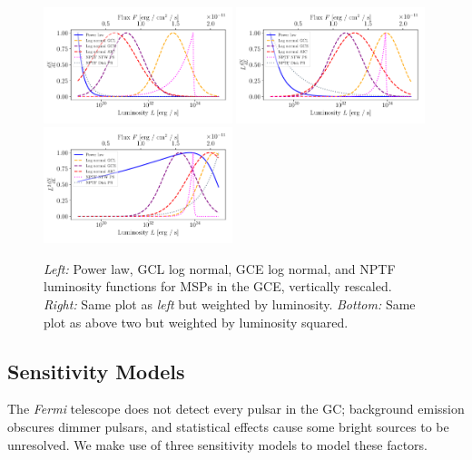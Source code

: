 \documentclass[a4paper,11pt]{article}
\begin{document}
\begin{figure}
    \centering
    \includegraphics[width=0.49\textwidth]{figs/lum-funcs.pdf}
    \includegraphics[width=0.49\textwidth]{figs/l-lum-funcs.pdf}
    \includegraphics[width=0.49\textwidth]{figs/l2-lum-funcs.pdf}
    \caption{\textit{Left:} Power law, GCL log normal, GCE log normal, and NPTF luminosity functions for MSPs in the GCE, vertically rescaled. \textit{Right:} Same plot as \textit{left} but weighted by luminosity. \textit{Bottom:} Same plot as above two but weighted by luminosity squared.}
    \label{fig:lum-funcs}
\end{figure}


\subsection{Sensitivity Models}
\label{sec:sensitivity}
The \textit{Fermi} telescope does not detect every pulsar in the GC; background emission obscures dimmer pulsars, and statistical effects cause some bright sources to be unresolved. We make use of three sensitivity models to model these factors.
\end{document}
